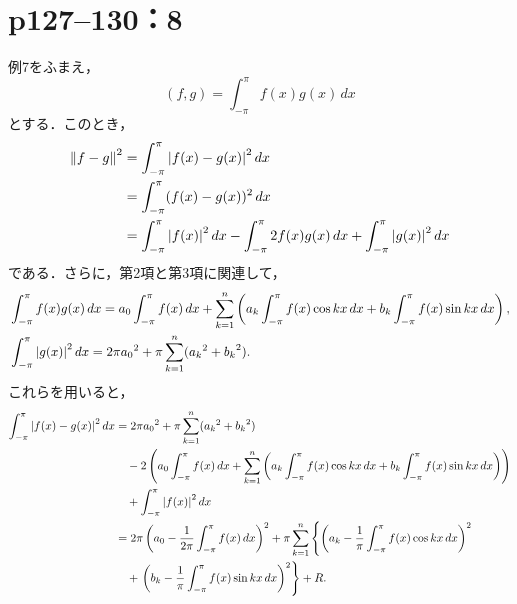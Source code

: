 \documentclass[a4paper,10pt,fleqn]{ltjsarticle}
\begin{document}
\newpage

\section*{p127--130：8}

\begin{tleftbar}
  例7をふまえ，
  \[
    (f, g) = \int_{-\pi}^{\pi} f(x) g(x) \, dx
  \]
  とする．このとき，
  \begin{align*}
    \norm{f-g}^2 & = \int_{-\pi}^{\pi} \abs{f(x) - g(x)}^2 \, dx                                                                       \\
                 & = \int_{-\pi}^{\pi} (f(x)-g(x))^2 \, dx                                                                             \\
                 & = \int_{-\pi}^{\pi} \abs{f(x)}^2 \,dx - \int_{-\pi}^{\pi} 2 f(x) g(x) \, dx + \int_{-\pi}^{\pi} \abs{g(x)}^2 \,  dx
  \end{align*}
  である．さらに，第2項と第3項に関連して，
  \begin{align*}
     & \int_{-\pi}^{\pi} f(x) g(x)  \, dx = a_0 \int_{-\pi}^{\pi} f(x) \,  dx + \sum_{k=1}^{n} \left( a_k \int_{-\pi}^{\pi} f(x) \cos kx \, dx + b_k \int_{-\pi}^{\pi} f(x) \sin kx \, dx \right), \\
     & \int_{-\pi}^{\pi} \abs{g(x)}^2 \,dx = 2\pi {a_0}^2 + \pi \sum_{k=1}^{n} ({a_k}^2 + {b_k}^2).
  \end{align*}
  これらを用いると，
  \begin{align*}
    \int_{-\pi}^{\pi} \abs{f(x) - g(x)}^2 \, dx
     & = 2\pi {a_0}^2 + \pi \sum_{k=1}^{n} ({a_k}^2 + {b_k}^2)                                                     \\
     & \quad - 2 \left( a_0 \int_{-\pi}^{\pi} f(x) \, dx
    + \sum_{k=1}^{n} \left( a_k \int_{-\pi}^{\pi} f(x) \cos kx \, dx
    + b_k \int_{-\pi}^{\pi} f(x) \sin kx \, dx \right) \right)                                                     \\
     & \quad + \int_{-\pi}^{\pi} \abs{f(x)}^2 \, dx                                                                \\
     & = 2\pi \left( a_0 - \frac{1}{2\pi} \int_{-\pi}^{\pi} f(x) \, dx \right)^2
    + \pi \sum_{k=1}^{n} \left\{ \left( a_k - \frac{1}{\pi} \int_{-\pi}^{\pi} f(x) \cos kx \, dx \right)^2 \right. \\
     & \quad + \left. \left( b_k - \frac{1}{\pi} \int_{-\pi}^{\pi} f(x) \sin kx \, dx \right)^2 \right\} + R.
  \end{align*}


\end{tleftbar}
\end{document}
